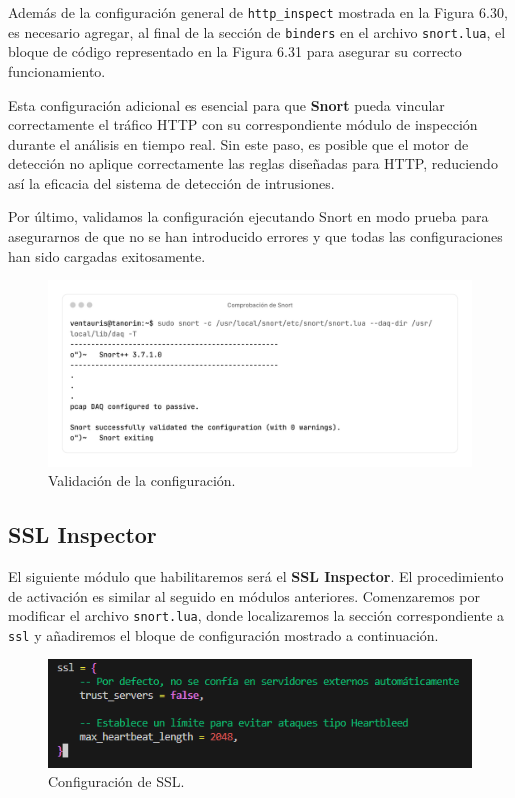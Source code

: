 \documentclass[12pt,a4paper]{report}
\begin{document}

Además de la configuración general de \texttt{http\_inspect} mostrada en la Figura 6.30, es necesario agregar, al final de la sección de \texttt{binders} en el archivo \texttt{snort.lua}, el bloque de código representado en la Figura 6.31 para asegurar su correcto funcionamiento.
\newline

Esta configuración adicional es esencial para que \textbf{Snort} pueda vincular correctamente el tráfico HTTP con su correspondiente módulo de inspección durante el análisis en tiempo real. Sin este paso, es posible que el motor de detección no aplique correctamente las reglas diseñadas para HTTP, reduciendo así la eficacia del sistema de detección de intrusiones.
\newline

Por último, validamos la configuración ejecutando Snort en modo prueba para asegurarnos de que no se han introducido errores y que todas las configuraciones han sido cargadas exitosamente.

\begin{figure}[H]
	\centering
	\includegraphics[scale=0.1]{http_inspect/6-6.png}
	\caption{Validación de la configuración.}
\end{figure}


\subsection{SSL Inspector}

El siguiente módulo que habilitaremos será el \textbf{SSL Inspector}. El procedimiento de activación es similar al seguido en módulos anteriores. Comenzaremos por modificar el archivo \texttt{snort.lua}, donde localizaremos la sección correspondiente a \texttt{ssl} y añadiremos el bloque de configuración mostrado a continuación.

\begin{figure}[H]
	\centering
	\includegraphics[scale=0.8]{ssl_inspect/8.png}
	\caption{Configuración de SSL.}
\end{figure}
\end{document}
